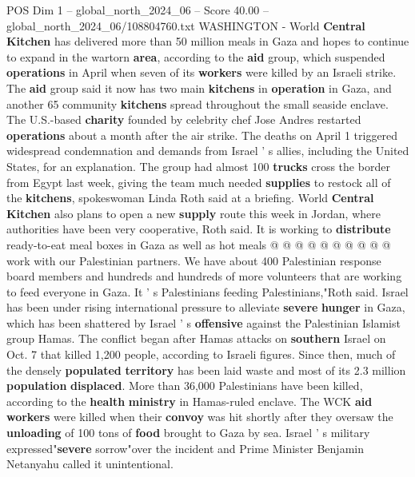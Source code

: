 \begin{textsample}{POS Dim 1 – global\_north\_2024\_06 – Score 40.00 – global\_north\_2024\_06/108804760.txt}  \label{ex:f1_pos_233}
WASHINGTON - World \textbf{Central} \textbf{Kitchen} has delivered more than 50 million meals in Gaza and hopes to continue to expand in the wartorn \textbf{area}, according to the \textbf{aid} group, which suspended \textbf{operations} in April when seven of its \textbf{workers} were killed by an Israeli strike.
The \textbf{aid} group said it now has two main \textbf{kitchens} in \textbf{operation} in Gaza, and another 65 community \textbf{kitchens} spread throughout the small seaside enclave.
The U.S.-based \textbf{charity} founded by celebrity chef Jose Andres restarted \textbf{operations} about a month after the air strike.
The deaths on April 1 triggered widespread condemnation and demands from Israel ' s allies, including the United States, for an explanation.
The group had almost 100 \textbf{trucks} cross the border from Egypt last week, giving the team much needed \textbf{supplies} to restock all of the \textbf{kitchens}, spokeswoman Linda Roth said at a briefing.
World \textbf{Central} \textbf{Kitchen} also plans to open a new \textbf{supply} route this week in Jordan, where authorities have been very cooperative, Roth said.
It is working to \textbf{distribute} ready-to-eat meal boxes in Gaza as well as hot meals @ @ @ @ @ @ @ @ @ @ work with our Palestinian partners.
We have about 400 Palestinian response board members and hundreds and hundreds of more volunteers that are working to feed everyone in Gaza.
It ' s Palestinians feeding Palestinians,"Roth said.
Israel has been under rising international pressure to alleviate \textbf{severe} \textbf{hunger} in Gaza, which has been shattered by Israel ' s \textbf{offensive} against the Palestinian Islamist group Hamas.
The conflict began after Hamas attacks on \textbf{southern} Israel on Oct. 7 that killed 1,200 people, according to Israeli figures.
Since then, much of the densely \textbf{populated} \textbf{territory} has been laid waste and most of its 2.3 million \textbf{population} \textbf{displaced}.
More than 36,000 Palestinians have been killed, according to the \textbf{health} \textbf{ministry} in Hamas-ruled enclave.
The WCK \textbf{aid} \textbf{workers} were killed when their \textbf{convoy} was hit shortly after they oversaw the \textbf{unloading} of 100 tons of \textbf{food} brought to Gaza by sea.
Israel ' s military expressed"\textbf{severe} sorrow"over the incident and Prime Minister Benjamin Netanyahu called it unintentional.

\end{textsample}
